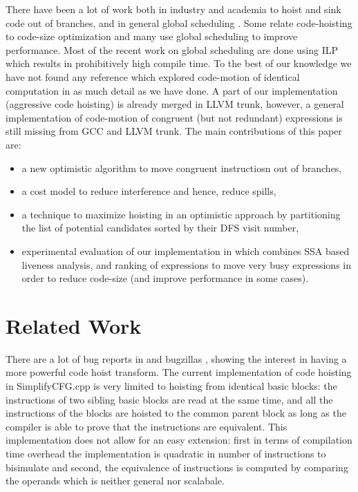 \documentclass[acmlarge,review]{acmart}\settopmatter{printfolios=true}
\begin{document}
There have been a lot of work both in industry and academia to hoist and sink
code out of branches, and in general global scheduling
\cite{click1995global}. Some relate code-hoisting to code-size optimization
\cite{rosen1988global} and many \cite{barany2013, shobaki2013} use global
scheduling to improve performance. Most of the recent work on global scheduling
are done using ILP which results in prohibitively high compile time. To the best
of our knowledge we have not found any reference which explored code-motion of
identical computation in as much detail as we have done. A part of our
implementation (aggressive code hoisting) is already merged in LLVM trunk,
however, a general implementation of code-motion of congruent (but not
redundant) expressions is still missing from GCC and LLVM trunk. The main
contributions of this paper are:
\begin{itemize}
\item a new optimistic algorithm to move congruent instructiosn out of branches,
\item a cost model to reduce interference and hence, reduce spills,
\item a technique to maximize hoisting in an optimistic approach by partitioning
  the list of potential candidates sorted by their DFS visit number,
\item experimental evaluation of our implementation in \LLVM{} which combines
  SSA based liveness analysis, and ranking of expressions to move very busy
  expressions in order to reduce code-size (and improve performance in some
  cases).
\end{itemize}

\section{Related Work}

There are a lot of bug reports in \GCC{} and \LLVM{} bugzillas
\cite{GCCCodeHoistingBugs, LLVMCodeHoistingBugs}, showing the interest in having
a more powerful code hoist transform.  The current \LLVM{} implementation of
code hoisting in SimplifyCFG.cpp is very limited to hoisting from identical
basic blocks: the instructions of two sibling basic blocks are read at the same
time, and all the instructions of the blocks are hoisted to the common parent
block as long as the compiler is able to prove that the instructions are
equivalent.  This implementation does not allow for an easy extension: first in
terms of compilation time overhead the implementation is quadratic in number of
instructions to bisimulate and second, the equivalence of instructions is
computed by comparing the operands which is neither general nor scalabale.
\end{document}

